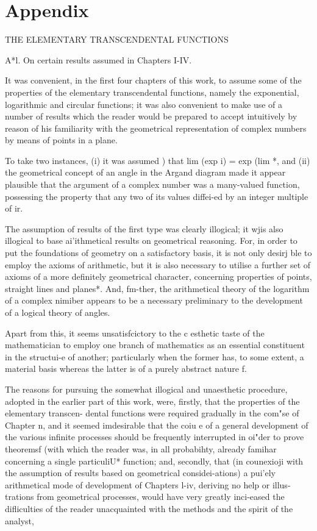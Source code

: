\chapter{Appendix}
THE ELEMENTARY TRANSCENDENTAL FUNCTIONS

A*l. On certain results assumed in Chapters I-IV.

It was convenient, in the first four chapters of this work, to assume
some of the properties of the elementary transcendental functions,
namely the exponential, logarithmic and circular functions; it was
also convenient to make use of a number of results which the reader
would be prepared to accept intuitively by reason of his familiarity
with the geometrical representation of complex numbers by means of
points in a plane.

To take two instances, (i) it was assumed ) that lim (exp i) =
exp (lim *, and (ii) the geometrical concept of an angle in the
Argand diagram made it appear plausible that the argument of a complex
number was a many-valued function, possessing the property that any
two of its values diffei-ed by an integer multiple of ir.

The assumption of results of the first type was clearly illogical; it
wjis also illogical to base ai'ithmetical results on geometrical
reasoning. For, in order to put the foundations of geometry on a
satisfactory basis, it is not only desirj ble to employ the axioms of
arithmetic, but it is also necessary to utilise a further set of
axioms of a more definitely geometrical character, concerning
properties of points, straight lines and planes*. And, fm-ther, the
arithmetical theory of the logarithm of a complex nimiber appears to
be a necessary preliminary to the development of a logical theory of
angles.

Apart from this, it seems unsatisfcictory to the c esthetic taste of
the mathematician to employ one branch of mathematics as an essential
constituent in the structui-e of another; particularly when the
former has, to some extent, a material basis whereas the latter is of
a purely abstract nature f.

The reasons for pursuing the somewhat illogical and unaesthetic
procedure, adopted in the earlier part of this work, were, firstly,
that the properties of the elementary transcen- dental functions were
required gradually in the com"se of Chapter n, and it seemed
imdesirable that the coiu e of a general development of the various
infinite processes should be frequently interrupted in oi"der to prove
theoremsf (with which the reader was, in all probabihty, already
famihar concerning a single particuliU* function; and, secondly, that
(in counexioji with the assumption of results based on geometrical
considei-ations) a pui'ely arithmetical mode of development of
Chapters l-iv, deriving no help or illus- trations from geometrical
processes, would have very greatly inci-eased the difliculties of the
reader unacquainted with the methods and the spirit of the analyst,

